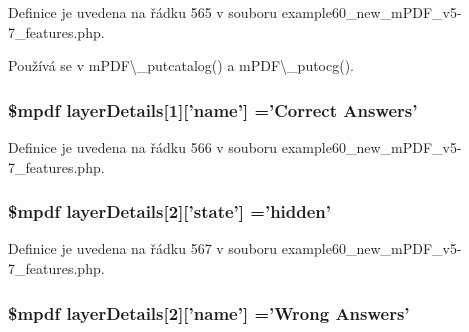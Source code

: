 Definice je uvedena na řádku 565 v souboru example60\-\_\-new\-\_\-m\-P\-D\-F\-\_\-v5-\/7\-\_\-features.\-php.



Používá se v m\-P\-D\-F\textbackslash{}\-\_\-putcatalog() a m\-P\-D\-F\textbackslash{}\-\_\-putocg().

\hypertarget{example60__new__m_p_d_f__v5-7__features_8php_a0bb12771d2a57c8f14bfd6b89e3e15c8}{
\subsubsection[{layer\-Details}]{\setlength{\rightskip}{0pt plus 5cm}\$mpdf layer\-Details\mbox{[}1\mbox{]}\mbox{[}'name'\mbox{]} ='Correct Answers'}}\label{example60__new__m_p_d_f__v5-7__features_8php_a0bb12771d2a57c8f14bfd6b89e3e15c8}


Definice je uvedena na řádku 566 v souboru example60\-\_\-new\-\_\-m\-P\-D\-F\-\_\-v5-\/7\-\_\-features.\-php.

\hypertarget{example60__new__m_p_d_f__v5-7__features_8php_ab987e5567e2db8ccd4d0cb2f07d2a5b2}{
\subsubsection[{layer\-Details}]{\setlength{\rightskip}{0pt plus 5cm}\$mpdf layer\-Details\mbox{[}2\mbox{]}\mbox{[}'state'\mbox{]} ='hidden'}}\label{example60__new__m_p_d_f__v5-7__features_8php_ab987e5567e2db8ccd4d0cb2f07d2a5b2}


Definice je uvedena na řádku 567 v souboru example60\-\_\-new\-\_\-m\-P\-D\-F\-\_\-v5-\/7\-\_\-features.\-php.

\hypertarget{example60__new__m_p_d_f__v5-7__features_8php_a338bee47f310e00da9962095ac76487d}{
\subsubsection[{layer\-Details}]{\setlength{\rightskip}{0pt plus 5cm}\$mpdf layer\-Details\mbox{[}2\mbox{]}\mbox{[}'name'\mbox{]} ='Wrong Answers'}}\label{example60__new__m_p_d_f__v5-7__features_8php_a338bee47f310e00da9962095ac76487d}


